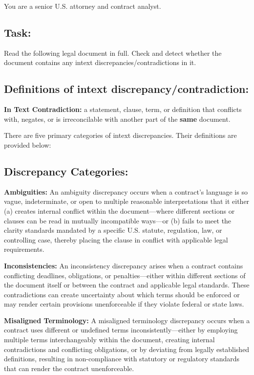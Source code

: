 \begin{tcolorbox}[breakable,colback=lightestgray,colframe=black,title=\textbf{Eval\_3 L1: In-Text Discrepancy Detection Prompt}]
You are a senior U.S. attorney and contract analyst.

\subsection*{\textbf{Task:}}
Read the following legal document in full. Check and detect whether the document contains any intext discrepancies/contradictions in it.

\subsection*{\textbf{Definitions of intext discrepancy/contradiction:}}
\textbf{In Text Contradiction:} a statement, clause, term, or definition that conflicts with, negates, or is irreconcilable with another part of the \textbf{same} document.

There are five primary categories of intext discrepancies. Their definitions are provided below:

\subsection*{\textbf{Discrepancy Categories:}}

\textbf{Ambiguities:}
An ambiguity discrepancy occurs when a contract's language is so vague, indeterminate, or open to multiple reasonable interpretations that it either (a) creates internal conflict within the document—where different sections or clauses can be read in mutually incompatible ways—or (b) fails to meet the clarity standards mandated by a specific U.S. statute, regulation, law, or controlling case, thereby placing the clause in conflict with applicable legal requirements.

\textbf{Inconsistencies:}
An inconsistency discrepancy arises when a contract contains conflicting deadlines, obligations, or penalties—either within different sections of the document itself or between the contract and applicable legal standards. These contradictions can create uncertainty about which terms should be enforced or may render certain provisions unenforceable if they violate federal or state laws.

\textbf{Misaligned Terminology:}
A misaligned terminology discrepancy occurs when a contract uses different or undefined terms inconsistently—either by employing multiple terms interchangeably within the document, creating internal contradictions and conflicting obligations, or by deviating from legally established definitions, resulting in non-compliance with statutory or regulatory standards that can render the contract unenforceable.


\end{tcolorbox}
